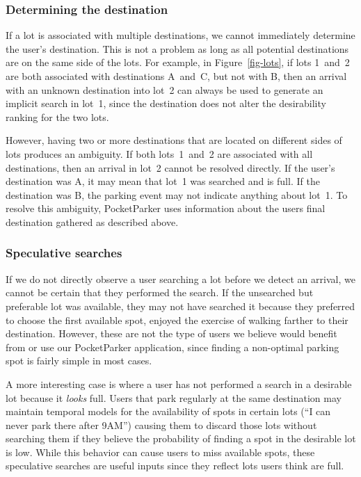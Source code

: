 \subsubsection{Determining the destination}

If a lot is associated with multiple destinations, we cannot immediately
determine the user's destination.  This is not a problem as long as all
potential destinations are on the same side of the lots.  For example, in
Figure~\ref{fig-lots}, if lots 1~and~2 are both associated with destinations
A~and~C, but not with B, then an arrival with an unknown destination into lot~2
can always be used to generate an implicit search in lot~1, since the
destination does not alter the desirability ranking for the two lots.

However, having two or more destinations that are located on different sides of
lots produces an ambiguity.  If both lots~1~and~2 are associated with all
destinations, then an arrival in lot~2 cannot be resolved directly. If the
user's destination was A, it may mean that lot~1 was searched and is full.
If the destination was B, the parking event may not indicate anything about
lot~1. To resolve this ambiguity, PocketParker uses information about the users
final destination gathered as described above.

\subsubsection{Speculative searches}

If we do not directly observe a user searching a lot before we detect an
arrival, we cannot be certain that they performed the search. If the unsearched
but preferable lot was available, they may not have searched it because they
preferred to choose the first available spot, enjoyed the exercise of walking
farther to their destination. However, these are not the type of users we
believe would benefit from or use our PocketParker application, since finding a
non-optimal parking spot is fairly simple in most cases.

A more interesting case is where a user has not performed a search in a
desirable lot because it \textit{looks} full. Users that park regularly at
the same destination may maintain temporal models for the availability of
spots in certain lots (``I can never park there after 9AM'') causing them to
discard those lots without searching them if they believe the probability of
finding a spot in the desirable lot is low. While this behavior can cause
users to miss available spots, these speculative searches are useful inputs
since they reflect lots users think are full.


